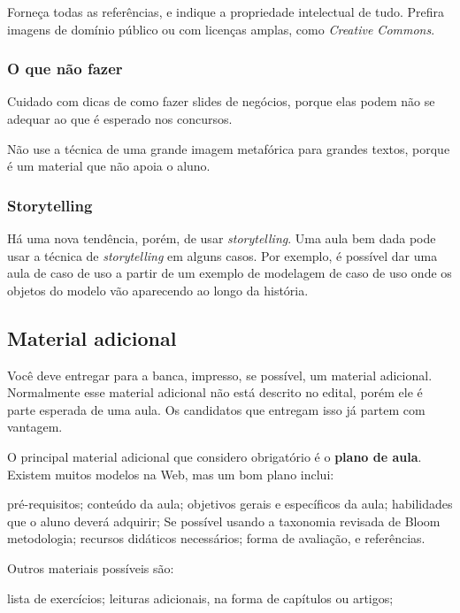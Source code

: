 \documentclass{article}
\begin{document}
Forneça todas as referências, e indique a propriedade intelectual de tudo.
Prefira imagens de domínio público ou com licenças amplas, como \textit{Creative Commons}.

\subsubsection{O que não fazer}

Cuidado com dicas de como fazer slides de negócios, porque elas podem não se adequar ao que é esperado nos concursos.

Não use a técnica de uma grande imagem metafórica para grandes textos, porque é um material que não apoia o aluno.

\subsubsection{Storytelling}

Há uma nova tendência, porém, de usar \textit{storytelling}.
Uma aula bem dada pode usar a técnica de \textit{storytelling} em alguns casos.
Por exemplo, é possível dar uma aula de caso de uso a partir de um exemplo de modelagem de caso de uso onde os objetos do modelo vão aparecendo ao longo da história.

\subsection{Material adicional}

Você deve entregar para a banca, impresso, se possível, um material adicional. Normalmente esse material adicional não está descrito no edital, porém ele é parte esperada de uma aula. Os candidatos que entregam isso já partem com vantagem.

O principal material adicional que considero obrigatório é o \textbf{plano de aula}. Existem muitos modelos na Web, mas um bom plano inclui:
\begin{outline}
\1 pré-requisitos;
\1 conteúdo da aula;
\1 objetivos gerais e específicos da aula;
\1 habilidades que o aluno deverá adquirir;
\2 Se possível usando a taxonomia revisada de Bloom
\1 metodologia;
\1 recursos didáticos necessários;
\1 forma de avaliação, e
\1 referências.
\end{outline}

Outros materiais possíveis são:
\begin{outline}
\1 lista de exercícios;
\1 leituras adicionais, na forma de capítulos ou artigos;
\end{outline}
\end{document}
